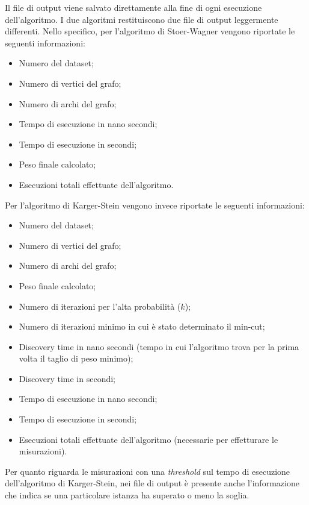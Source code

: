 Il file di output viene salvato direttamente alla fine di ogni esecuzione dell'algoritmo. I due algoritmi restituiscono due file di output leggermente differenti. Nello specifico, per l'algoritmo di Stoer-Wagner vengono riportate le seguenti informazioni:

\begin{itemize}
    \item Numero del dataset;
    \item Numero di vertici del grafo;
    \item Numero di archi del grafo;
    \item Tempo di esecuzione in nano secondi;
    \item Tempo di esecuzione in secondi;
    \item Peso finale calcolato;
    \item Esecuzioni totali effettuate dell'algoritmo.
\end{itemize}

Per l'algoritmo di Karger-Stein vengono invece riportate le seguenti informazioni:

\begin{itemize}
  \item Numero del dataset;
  \item Numero di vertici del grafo;
  \item Numero di archi del grafo;
  \item Peso finale calcolato;
  \item Numero di iterazioni per l'alta probabilità ($k$);
  \item Numero di iterazioni minimo in cui è stato determinato il min-cut;
  \item Discovery time in nano secondi (tempo in cui l'algoritmo trova per la prima volta il taglio di peso minimo);
  \item Discovery time in secondi;
  \item Tempo di esecuzione in nano secondi;
  \item Tempo di esecuzione in secondi;
  \item Esecuzioni totali effettuate dell'algoritmo (necessarie per effetturare le misurazioni).
\end{itemize}

Per quanto riguarda le misurazioni con una \textit{threshold} sul tempo di esecuzione 
dell'algoritmo di Karger-Stein, nei file di output è presente anche l'informazione 
che indica se una particolare istanza ha superato o meno la soglia.
